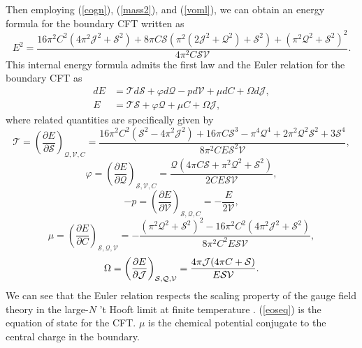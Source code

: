 \documentclass[a4paper,11pt]{article}
\newcommand{\eq}[1]{(\ref{#1})}
\begin{document}
Then employing  \eq{cogn}, \eq{mass2}, and \eq{voml}, we can obtain an energy formula for the boundary CFT written as
\begin{equation}\label{mass3}
E^2=\frac{16 \pi ^2 C^2 \left(4 \pi ^2 \mathcal{J}^2+\mathcal{S}^2\right)+8 \pi  C \mathcal{S} \left(\pi ^2 \left(2 \mathcal{J}^2+\mathcal{Q}^2\right)+\mathcal{S}^2\right)+\left(\pi ^2 \mathcal{Q}^2+\mathcal{S}^2\right)^2}{4 \pi ^2 C \mathcal{S} \mathcal{V}}.
\end{equation}
This internal energy formula admits the first law and the Euler relation for the boundary CFT  as
\begin{align}
d E&=\mathcal{T} d \mathcal{S}+\varphi d \mathcal{Q}-p d \mathcal{V}+\mu d C+\Omega d\mathcal{J}\label{affir},\\
E&=\mathcal{T} \mathcal{S}+\varphi \mathcal{Q}+\mu C+\Omega \mathcal{J},
\end{align}
where related quantities are specifically given by
\begin{equation}\label{cfttemp}
\mathcal{T}=\left(\frac{\partial E}{\partial \mathcal{S}}\right)_{\mathcal{Q}, \mathcal{V}, C}=\frac{16 \pi ^2 C^2 \left(\mathcal{S}^2-4 \pi ^2 \mathcal{J}^2\right)+16 \pi  C \mathcal{S}^3-\pi ^4 \mathcal{Q}^4+2 \pi ^2 \mathcal{Q}^2 \mathcal{S}^2+3 \mathcal{S}^4}{8 \pi ^2 C E \mathcal{S}^2 \mathcal{V}},
\end{equation}
\begin{equation}
\varphi=\left(\frac{\partial E}{\partial \mathcal{Q}}\right)_{\mathcal{S}, \mathcal{V}, C}=\frac{\mathcal{Q} \left(4 \pi  C \mathcal{S}+\pi ^2 \mathcal{Q}^2+\mathcal{S}^2\right)}{2 C E \mathcal{S} \mathcal{V}},
\end{equation}
\begin{equation}\label{eoseq}
-p=\left(\frac{\partial E}{\partial \mathcal{V}}\right)_{\mathcal{S}, \mathcal{Q}, C}=-\frac{E}{2\mathcal{V}},
\end{equation}
\begin{equation}
\mu=\left(\frac{\partial E}{\partial C}\right)_{\mathcal{S}, \mathcal{Q}, \mathcal{V}}=-\frac{\left(\pi ^2 \mathcal{Q}^2+\mathcal{S}^2\right)^2-16 \pi ^2 C^2 \left(4 \pi ^2 \mathcal{J}^2+\mathcal{S}^2\right)}{8 \pi ^2 C^2 E \mathcal{S} \mathcal{V}},
\end{equation}
\begin{equation}
\Omega=\left(\frac{\partial E}{\partial \mathcal{J}}\right)_{\mathcal{S}, \mathcal{Q}, \mathcal{V}}=\frac{4 \pi  \mathcal{J} (4 \pi  C+\mathcal{S})}{E \mathcal{S} \mathcal{V}}.
\end{equation}
We can see that the Euler relation respects the scaling property of the gauge field theory in the large-$N$ 't Hooft limit  at finite temperature \cite{tHooft:1973alw}.  \eq{eoseq} is the equation of state for the CFT. $\mu$ is the chemical potential conjugate to the central charge in the boundary.
\end{document}
